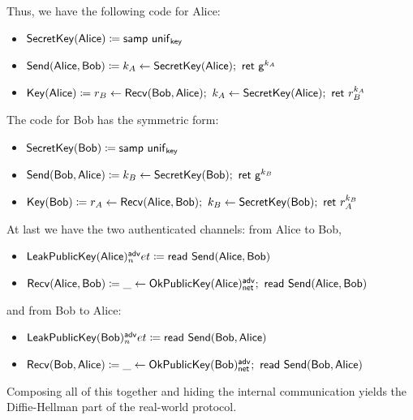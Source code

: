 Thus, we have the following code for Alice:
\begin{itemize}
\item $\mathsf{SecretKey}(\mathsf{Alice}) \coloneqq \mathsf{samp} \ \mathsf{unif}_{\mathsf{key}}$
\item $\mathsf{Send}(\mathsf{Alice},\mathsf{Bob}) \coloneqq k_A \leftarrow \mathsf{SecretKey}(\mathsf{Alice}); \ \mathsf{ret} \ \mathsf{g}^{k_A}$
\item $\Key(\Alice) \coloneqq r_B \leftarrow \Recv(\Bob,\Alice); \ k_A \leftarrow \SecretKey(\Alice); \ \ret{r_B^{k_A}}$
\end{itemize}
The code for Bob has the symmetric form:
\begin{itemize}
\item $\mathsf{SecretKey}(\mathsf{Bob}) \coloneqq \mathsf{samp} \ \mathsf{unif}_{\mathsf{key}}$
\item $\mathsf{Send}(\mathsf{Bob},\mathsf{Alice}) \coloneqq k_B \leftarrow \mathsf{SecretKey}(\mathsf{Bob}); \ \mathsf{ret} \ \mathsf{g}^{k_B}$
\item $\Key(\Bob) \coloneqq r_A \leftarrow \Recv(\Alice,\Bob); \ k_B \leftarrow \SecretKey(\Bob); \ \ret{r_A^{k_B}}$
\end{itemize}
At last we have the two authenticated channels: from Alice to Bob,
\begin{itemize}
\item $\mathsf{LeakPublicKey}(\mathsf{Alice})^{\mathsf{adv}}_net \coloneqq \mathsf{read} \ \mathsf{Send}(\mathsf{Alice},\mathsf{Bob})$
\item $\Recv(\Alice,\Bob) \coloneqq \_ \leftarrow \OkPublicKey(\Alice)^\adv_\net; \ \read{\Send(\Alice,\Bob)}$
\end{itemize}
and from Bob to Alice:
\begin{itemize}
\item $\mathsf{LeakPublicKey}(\mathsf{Bob})^{\mathsf{adv}}_net \coloneqq \mathsf{read} \ \mathsf{Send}(\mathsf{Bob},\mathsf{Alice})$
\item $\Recv(\Bob,\Alice) \coloneqq \_ \leftarrow \OkPublicKey(\Bob)^\adv_\net; \ \read{\Send(\Bob,\Alice)}$
\end{itemize}
Composing all of this together and hiding the internal communication yields the Diffie-Hellman part of the real-world protocol.

